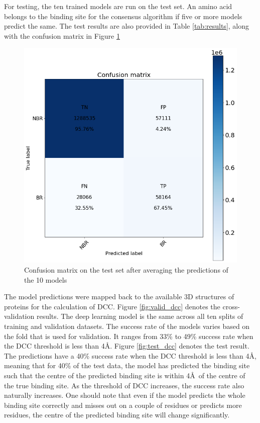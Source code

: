 \documentclass[journal=jacsat,manuscript=article]{achemso}
\begin{document}
\newpage
For testing, the ten trained models are run on the test set. An amino acid belongs to the binding site for the consensus algorithm if five or more models predict the same. The test results are also provided in Table \ref{tab:results}, along with the confusion matrix in Figure \ref{fig:test_cm}

\begin{figure}
    \centering
    \noindent\includegraphics[scale=0.4]{test_cm.png}
    \caption{\centering Confusion matrix on the test set after averaging the predictions of the 10 models}
    \label{fig:test_cm}
\end{figure}

The model predictions were mapped back to the available 3D structures of proteins for the calculation of DCC. Figure \ref{fig:valid_dcc} denotes the cross-validation results. The deep learning model is the same across all ten splits of training and validation datasets. The success rate of the models varies based on the fold that is used for validation. It ranges from 33\% to 49\% success rate when the DCC threshold is less than 4\AA. Figure \ref{fig:test_dcc} denotes the test result. The predictions have a 40\% success rate when the DCC threshold is less than 4\AA, meaning that for 40\% of the test data, the model has predicted the binding site such that the centre of the predicted binding site is within 4\AA \ of the centre of the true binding site. As the threshold of DCC increases, the success rate also naturally increases. One should note that even if the model predicts the whole binding site correctly and misses out on a couple of residues or predicts more residues, the centre of the predicted binding site will change significantly.
\end{document}
